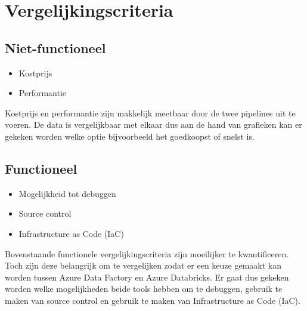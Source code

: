 \chapter{Vergelijkingscriteria}%
\label{ch:vergelijkingscriteria}

\section{Niet-functioneel}

\begin{itemize}
    \item Kostprijs
    \item Performantie
\end{itemize}

Kostprijs en performantie zijn makkelijk meetbaar door de twee pipelines uit te voeren. De data is vergelijkbaar met elkaar dus aan de hand van grafieken kan er gekeken worden welke optie bijvoorbeeld het goedkoopst of snelst is. 

\section{Functioneel}

\begin{itemize}
    \item Mogelijkheid tot debuggen
    \item Source control
    \item Infrastructure as Code (IaC)
\end{itemize}

Bovenstaande functionele vergelijkingscriteria zijn moeilijker te kwantificeren. Toch zijn deze belangrijk om te vergelijken zodat er een keuze gemaakt kan worden tussen Azure Data Factory en Azure Databricks. Er gaat dus gekeken worden welke mogelijkheden beide tools hebben om te debuggen, gebruik te maken van source control en gebruik te maken van Infrastructure as Code (IaC). 
